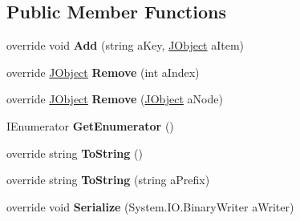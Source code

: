 \subsection*{Public Member Functions}
\begin{DoxyCompactItemize}
\item 
\hypertarget{class_simple_j_s_o_n_1_1_j_array_abac8f5da17ed67629f50020340ce22bd}{override void {\bfseries Add} (string a\+Key, \hyperlink{class_simple_j_s_o_n_1_1_j_object}{J\+Object} a\+Item)}\label{class_simple_j_s_o_n_1_1_j_array_abac8f5da17ed67629f50020340ce22bd}

\item 
\hypertarget{class_simple_j_s_o_n_1_1_j_array_ac5d23d5c8761dbf183097b326122bcf5}{override \hyperlink{class_simple_j_s_o_n_1_1_j_object}{J\+Object} {\bfseries Remove} (int a\+Index)}\label{class_simple_j_s_o_n_1_1_j_array_ac5d23d5c8761dbf183097b326122bcf5}

\item 
\hypertarget{class_simple_j_s_o_n_1_1_j_array_a0d9dfeedb9b6bf612e7fe9ee0011e39a}{override \hyperlink{class_simple_j_s_o_n_1_1_j_object}{J\+Object} {\bfseries Remove} (\hyperlink{class_simple_j_s_o_n_1_1_j_object}{J\+Object} a\+Node)}\label{class_simple_j_s_o_n_1_1_j_array_a0d9dfeedb9b6bf612e7fe9ee0011e39a}

\item 
\hypertarget{class_simple_j_s_o_n_1_1_j_array_a5e4c3baf36b35d8efab982219312b37d}{I\+Enumerator {\bfseries Get\+Enumerator} ()}\label{class_simple_j_s_o_n_1_1_j_array_a5e4c3baf36b35d8efab982219312b37d}

\item 
\hypertarget{class_simple_j_s_o_n_1_1_j_array_a2763e8ec5757b2c4c8c6ca7847b4ce3a}{override string {\bfseries To\+String} ()}\label{class_simple_j_s_o_n_1_1_j_array_a2763e8ec5757b2c4c8c6ca7847b4ce3a}

\item 
\hypertarget{class_simple_j_s_o_n_1_1_j_array_a1d043e08ed8b63da1e6df1bcbca106dc}{override string {\bfseries To\+String} (string a\+Prefix)}\label{class_simple_j_s_o_n_1_1_j_array_a1d043e08ed8b63da1e6df1bcbca106dc}

\item 
\hypertarget{class_simple_j_s_o_n_1_1_j_array_ab5bb610931acb9e22baf65bde232c49a}{override void {\bfseries Serialize} (System.\+I\+O.\+Binary\+Writer a\+Writer)}\label{class_simple_j_s_o_n_1_1_j_array_ab5bb610931acb9e22baf65bde232c49a}

\end{DoxyCompactItemize}

